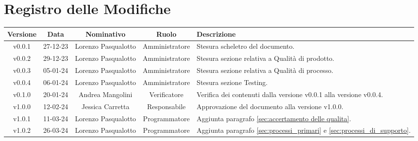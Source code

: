 \section*{\Large Registro delle Modifiche}
    \begin{table}[H]
        \centering
        \renewcommand\tabularxcolumn[1]{m{#1}} %
        \renewcommand{\arraystretch}{1.5}
        \begin{tabularx}{0.98\textwidth}
            {c|c|c|c|>{\centering\arraybackslash}X}
            \rowcolor{black}
            \textbf{\color{white} Versione} & \textbf{\color{white} Data} & \textbf{\color{white} Nominativo} & \textbf{\color{white} Ruolo} & \textbf{\color{white} Descrizione} \\ 
            \hline

            v0.0.1 & 27-12-23 & Lorenzo Pasqualotto & Amministratore & Stesura scheletro del documento. \\

            v0.0.2 & 29-12-23 & Lorenzo Pasqualotto & Amministratore & Stesura sezione relativa a Qualità di prodotto.\\

            v0.0.3 & 05-01-24 & Lorenzo Pasqualotto & Amministratore & Stesura sezione relativa a Qualità di processo.\\

            v0.0.4 & 06-01-24 & Lorenzo Pasqualotto & Amministratore & Stesura sezione Testing.\\

            v0.1.0 & 20-01-24 & Andrea Mangolini & Verificatore & Verifica dei contenuti dalla versione v0.0.1 alla versione v0.0.4.\\

            v1.0.0 & 12-02-24 & Jessica Carretta & Responsabile & Approvazione del documento alla versione v1.0.0.\\

            v1.0.1 & 11-03-24 & Lorenzo Pasqualotto & Programmatore & Aggiunta paragrafo \ref{sec:accertamento delle qualita}.\\

            v1.0.2 & 26-03-24 & Lorenzo Pasqualotto & Programmatore & Aggiunta paragrafo \ref{sec:processi_primari} e \ref{sec:processi_di_supporto}.\\


\end{tabularx}
\end{table}
